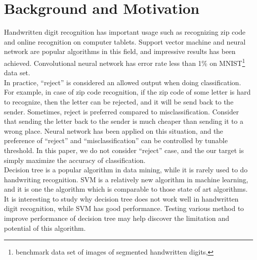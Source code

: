 \documentclass[a4paper,11pt]{nurop}
\begin{document}
\section{Background and Motivation}
Handwritten digit recognition has important usage such as recognizing zip code and online recognition on computer tablets. Support vector machine and neural network are popular algorithms in this field, and impressive results has been achieved. Convolutional neural network has error rate less than 1\% on MNIST\footnote{benchmark data set of images of segmented handwritten digits,} data set\cite{lecun98}. \\
In practice, ``reject'' is considered an allowed output when doing classification. For example, in case of zip code recognition, if the zip code of some letter is hard to recognize, then the letter can be rejected, and it will be send back to the sender. Sometimes, reject is preferred compared to misclassification. Consider that sending the letter back to the sender is much cheaper than sending it to a wrong place. Neural network has been applied on this situation, and the preference of ``reject'' and ``misclassification'' can be controlled by tunable threshold\cite{slg92}. In this paper, we do not consider ``reject'' case, and the our target is simply maximize the accuracy of classification.\\
Decision tree is a popular algorithm in data mining, while it is rarely used to do handwriting recognition. SVM is a relatively new algorithm in machine learning, and it is one the algorithm which is comparable to those state of art algorithms\cite{lecun98}.\\
It is interesting to study why decision tree does not work well in handwritten digit recognition, while SVM has good performance. Testing various method to improve performance of decision tree may help discover the limitation and potential of this algorithm.
\end{document}
